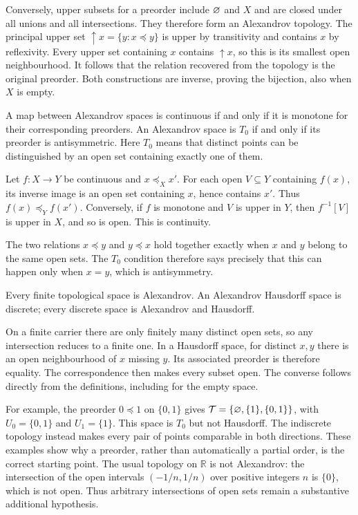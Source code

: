 Conversely, upper subsets for a preorder include $\varnothing$ and $X$
and are closed under all unions and all intersections. They therefore
form an Alexandrov topology. The principal upper set
$\uparrow x=\{y:x\preceq y\}$ is upper by transitivity and contains
$x$ by reflexivity. Every upper set containing $x$ contains
$\uparrow x$, so this is its smallest open neighbourhood. It follows
that the relation recovered from the topology is the original preorder.
Both constructions are inverse, proving the bijection, also when $X$
is empty.
\Done

\begin{proposition}
\label{prop:alexandrov_maps}
A map between Alexandrov spaces is continuous if and only if it is
monotone for their corresponding preorders. An Alexandrov space is
$T_0$ if and only if its preorder is antisymmetric. Here $T_0$ means
that distinct points can be distinguished by an open set containing
exactly one of them.
\end{proposition}
\Proof
Let $f:X\to Y$ be continuous and $x\preceq_X x'$. For each open
$V\subseteq Y$ containing $f(x)$, its inverse image is an open set
containing $x$, hence contains $x'$. Thus $f(x)\preceq_Y f(x')$.
Conversely, if $f$ is monotone and $V$ is upper in $Y$, then
$f^{-1}[V]$ is upper in $X$, and so is open. This is continuity.

The two relations $x\preceq y$ and $y\preceq x$ hold together
exactly when $x$ and $y$ belong to the same open sets. The $T_0$
condition therefore says precisely that this can happen only when
$x=y$, which is antisymmetry.
\Done

\begin{corollary}
Every finite topological space is Alexandrov. An Alexandrov Hausdorff
space is discrete; every discrete space is Alexandrov and Hausdorff.
\end{corollary}
\Proof
On a finite carrier there are only finitely many distinct open sets,
so any intersection reduces to a finite one. In a Hausdorff space,
for distinct $x,y$ there is an open neighbourhood of $x$ missing $y$.
Its associated preorder is therefore equality. The correspondence then
makes every subset open. The converse follows directly from the
definitions, including for the empty space.
\Done

For example, the preorder $0\preceq1$ on $\{0,1\}$ gives
$\mathcal T=\{\varnothing,\{1\},\{0,1\}\}$, with
$U_0=\{0,1\}$ and $U_1=\{1\}$. This space is $T_0$ but not
Hausdorff. The indiscrete topology instead makes every pair of points
comparable in both directions. These examples show why a preorder,
rather than automatically a partial order, is the correct starting point.
The usual topology on $\mathbb R$ is not Alexandrov: the intersection
of the open intervals $(-1/n,1/n)$ over positive integers $n$ is
$\{0\}$, which is not open. Thus arbitrary intersections of open
sets remain a substantive additional hypothesis.
\pagebreak
